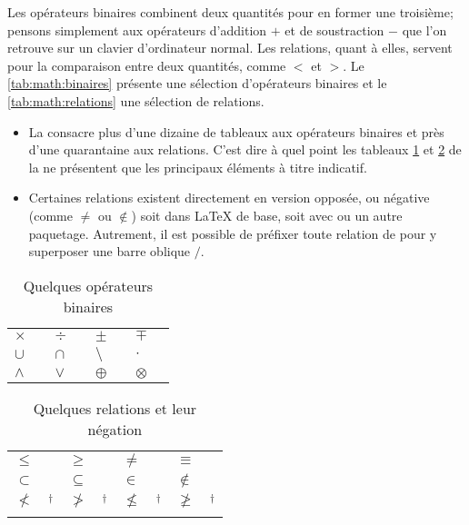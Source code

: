 Les opérateurs binaires combinent deux quantités pour en former une
troisième; pensons simplement aux opérateurs d'addition $+$ et de
soustraction $-$ que l'on retrouve sur un clavier d'ordinateur normal.
Les relations, quant à elles, servent pour la comparaison entre deux
quantités, comme $<$ et $>$. Le \autoref{tab:math:binaires}
présente une sélection d'opérateurs binaires et
le \autoref{tab:math:relations}  une sélection de relations.

\begin{itemize}
\item La %
  consacre plus d'une dizaine de tableaux aux opérateurs binaires et
  près d'une quarantaine aux relations. C'est dire à quel point les
  tableaux \ref*{tab:math:binaires} et \ref*{tab:math:relations} de la
   ne
  présentent que les principaux éléments à titre indicatif.
\item Certaines relations existent directement en version opposée, ou
  négative (comme $\neq$ ou $\notin$) soit dans {\LaTeX} de base, soit
  avec  ou un autre paquetage. Autrement, il est possible
  de préfixer toute relation de \cmd{\not} pour y superposer une
  barre oblique $/$.
\end{itemize}

\begin{table}[p]
  \caption{Quelques opérateurs binaires}
  \label{tab:math:binaires}
  \begin{tabularx}{1.0\linewidth}{lXlXlXlX}
    $\times$    & \cmd{\times} &
    $\div$      & \cmd{\div}   &
    $\pm$       & \cmd{\pm}    &
    $\mp$       & \cmd{\mp}    \\
    $\cup$      & \cmd{\cup} &
    $\cap$      & \cmd{\cap} &
    $\setminus$ & \cmd{\setminus} &
    $\cdot$     & \cmd{\cdot}  \\
    $\wedge$    & \cmd{\wedge} &
    $\vee$      & \cmd{\vee} &
    $\oplus$    & \cmd{\oplus} &
    $\otimes$   & \cmd{\otimes}
  \end{tabularx}
\end{table}

\begin{table}[p]
  \caption{Quelques relations et leur négation}
  \label{tab:math:relations}
  \begin{tabularx}{1.0\linewidth}{lXlXlXlX}
    $\leq$      & \cmd{\leq} &
    $\geq$      & \cmd{\geq}   &
    $\neq$      & \cmd{\neq}    &
    $\equiv$    & \cmd{\equiv}    \\
    $\subset$   & \cmd{\subset} &
    $\subseteq$ & \cmd{\subseteq}  &
    $\in$       & \cmd{\in} &
    $\notin$    & \cmd{\notin} \\
    $\nless$    & \cmd{\nless}$^\dagger$ &
    $\ngtr$     & \cmd{\ngtr}$^\dagger$   &
    $\nleq$     & \cmd{\nleq}$^\dagger$    &
    $\ngeq$     & \cmd{\ngeq}$^\dagger$ \\
    \addlinespace
  \end{tabularx}
\end{table}

